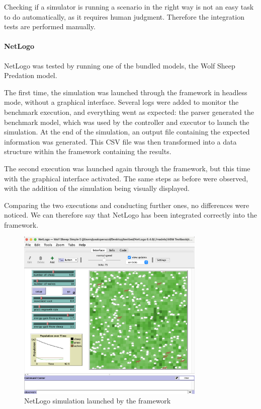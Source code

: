 \documentclass[12pt,a4paper,openright,twoside]{book}
\begin{document}
Checking if a simulator is running a scenario in the right way is not an easy task to do automatically, as it requires human judgment.
Therefore the integration tests are performed manually.

\paragraph*{NetLogo}
NetLogo was tested by running one of the bundled models, the Wolf Sheep Predation model.

The first time, the simulation was launched through the framework in headless mode, without a graphical interface.
Several logs were added to monitor the benchmark execution, and everything went as expected:
the parser generated the benchmark model, which was used by the controller and executor to launch the simulation.
At the end of the simulation, an output file containing the expected information was generated.
This CSV file was then transformed into a data structure within the framework containing the results.

The second execution was launched again through the framework, but this time with the graphical interface activated. 
The same steps as before were observed, with the addition of the simulation being visually displayed.

Comparing the two executions and conducting further ones, no differences were noticed. 
We can therefore say that NetLogo has been integrated correctly into the framework.

\begin{figure}
  \centering
  \includegraphics[width=0.8\textwidth]{figures/netlogo-sim.png}
  \caption{NetLogo simulation launched by the framework}
\end{figure}
\end{document}
